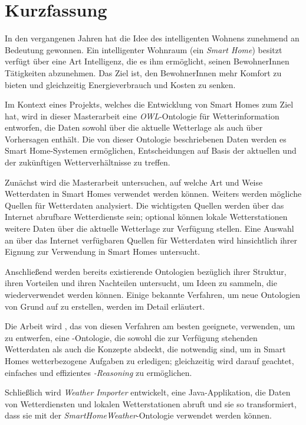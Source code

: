 \chapter*{Kurzfassung}

In den vergangenen Jahren hat die Idee des intelligenten Wohnens zunehmend an Bedeutung gewonnen. Ein intelligenter Wohnraum (ein \emph{Smart Home}) besitzt verfügt über eine Art Intelligenz, die es ihm ermöglicht, seinen BewohnerInnen Tätigkeiten abzunehmen. Das Ziel ist, den BewohnerInnen mehr Komfort zu bieten und gleichzeitig Energieverbrauch und Kosten zu senken.

Im Kontext eines Projekts, welches die Entwicklung von Smart Homes zum Ziel hat, wird in dieser Masterarbeit eine \emph{OWL}-Ontologie für Wetterinformation entworfen, die Daten sowohl über die aktuelle Wetterlage als auch über Vorhersagen enthält. Die von dieser Ontologie beschriebenen Daten werden es Smart Home-Systemen ermöglichen, Entscheidungen auf Basis der aktuellen und der zukünftigen Wetterverhältnisse zu treffen.

Zunächst wird die Masterarbeit untersuchen, auf welche Art und Weise Wetterdaten in Smart Homes verwendet werden können. Weiters werden mögliche Quellen für Wetterdaten analysiert. Die wichtigsten Quellen werden über das Internet abrufbare Wetterdienste sein; optional können lokale Wetterstationen weitere Daten über die aktuelle Wetterlage zur Verfügung stellen. Eine Auswahl an über das Internet verfügbaren Quellen für Wetterdaten wird hinsichtlich ihrer Eignung zur Verwendung in Smart Homes untersucht.

Anschließend werden bereits existierende Ontologien bezüglich ihrer Struktur, ihren Vorteilen und ihren Nachteilen untersucht, um Ideen zu sammeln, die wiederverwendet werden können. Einige bekannte Verfahren, um neue Ontologien von Grund auf zu erstellen, werden im Detail erläutert.

Die Arbeit wird \methontology, das von diesen Verfahren am besten geeignete, verwenden, um \smarthomeweather zu entwerfen, eine -Ontologie, die sowohl die zur Verfügung stehenden Wetterdaten als auch die Konzepte abdeckt, die notwendig sind, um in Smart Homes wetterbezogene Aufgaben zu erledigen; gleichzeitig wird darauf geachtet, einfaches und effizientes \emph{-Reasoning} zu ermöglichen.

Schließlich wird \emph{Weather Importer} entwickelt, eine Java-Applikation, die Daten von Wetterdiensten und lokalen Wetterstationen abruft und sie so transformiert, dass sie mit der \emph{Smart\-Home\-Weather}-Ontologie verwendet werden können.